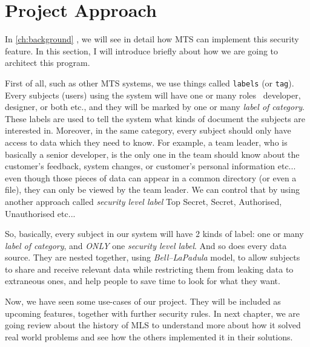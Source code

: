 \section{Project Approach}
In \autoref{ch:background} , we will see in detail how MTS can implement this security feature.
In this section, I will introduce briefly about how we are going to architect this program.

First of all, such as other MTS systems, we use things called \texttt{labels} (or \texttt{tag}).
Every subjects (\ie users) using the system will have one or many roles \eg\, developer, designer, or both etc., and they will be marked by one or many \emph{label of category}.
These labels are used to tell the system what kinds of document the subjects are interested in.
Moreover, in the same category, every subject should only have access to data which they need to know.
For example, a team leader, who is basically a senior developer, is the only one in the team should know about the customer's feedback, system changes, or customer's personal information etc...
even though those pieces of data can appear in a common directory (or even a file), they can only be viewed by the team leader.
We can control that by using another approach called \emph{security level label} \eg Top Secret, Secret, Authorised, Unauthorised etc...

So, basically, every subject in our system will have 2 kinds of label:
one or many \emph{label of category}, 
and \emph{ONLY} one \emph{security level label}.
And so does every data source.
They are nested together, using \emph{Bell--LaPadula} model,
to allow subjects to share and receive relevant data while restricting them from leaking data to extraneous ones,
and help people to save time to look for what they want.

Now, we have seen some use-cases of our project. 
They will be included as upcoming features, together with further security rules. 
In next chapter, we are going review about the history of MLS to understand more about how it solved real world problems and see how the others implemented it in their solutions.
